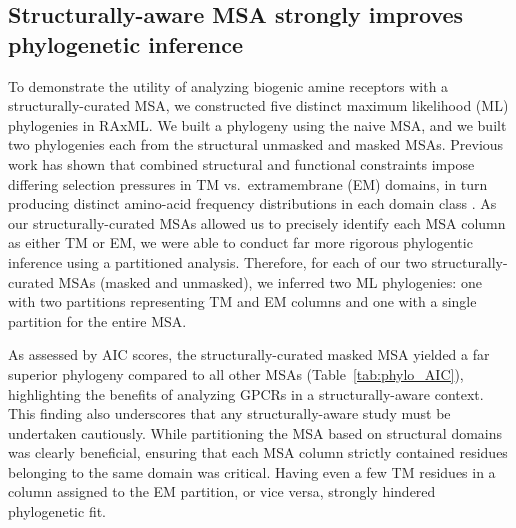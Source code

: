 \documentclass[fleqn,10pt]{wlpeerj}
\begin{document}
\subsection*{Structurally-aware MSA strongly improves phylogenetic inference}

To demonstrate the utility of analyzing biogenic amine receptors with a structurally-curated MSA, we constructed five distinct maximum likelihood (ML) phylogenies in RAxML. We built a phylogeny using the naive MSA, and we built two phylogenies each from the structural unmasked and masked MSAs. Previous work has shown that combined structural and functional constraints impose differing selection pressures in TM vs.\ extramembrane (EM) domains, in turn producing distinct amino-acid frequency distributions in each domain class \citep{Tourasse2000,Stevens2001,Julenius2006,Oberai2009,SpielmanWilke2013,FranzosaXueXia2013}. As our structurally-curated MSAs allowed us to precisely identify each MSA column as either TM or EM, we were able to conduct far more rigorous phylogentic inference using a partitioned analysis. Therefore, for each of our two structurally-curated MSAs (masked and unmasked), we inferred two ML phylogenies: one with two partitions representing TM and EM columns and one with a single partition for the entire MSA. 

As assessed by AIC scores, the structurally-curated masked MSA yielded a far superior phylogeny compared to all other MSAs (Table~\ref{tab:phylo_AIC}), highlighting the benefits of analyzing GPCRs in a structurally-aware context. This finding also underscores that any structurally-aware study must be undertaken cautiously. While partitioning the MSA based on structural domains was clearly beneficial, ensuring that each MSA column strictly contained residues belonging to the same domain was critical. Having even a few TM residues in a column assigned to the EM partition, or vice versa, strongly hindered phylogenetic fit.
\end{document}
